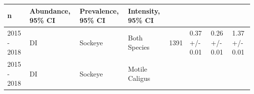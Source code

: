 \documentclass[fleqn,10pt]{wlpeerj} %
\begin{document}
\begin{longtable}[]{@{}llllrlll@{}}
\begin{minipage}[b]{0.04\columnwidth}
n\strut
\end{minipage} & \begin{minipage}[b]{0.14\columnwidth}\raggedright\strut
Abundance, 95\% CI\strut
\end{minipage} & \begin{minipage}[b]{0.14\columnwidth}\raggedright\strut
Prevalence, 95\% CI\strut
\end{minipage} & \begin{minipage}[b]{0.14\columnwidth}\raggedright\strut
Intensity, 95\% CI\strut
\end{minipage}\tabularnewline
\midrule
\endhead
\begin{minipage}[t]{0.09\columnwidth}\raggedright\strut
2015 - 2018\strut
\end{minipage} & \begin{minipage}[t]{0.06\columnwidth}\raggedright\strut
DI\strut
\end{minipage} & \begin{minipage}[t]{0.06\columnwidth}\raggedright\strut
Sockeye\strut
\end{minipage} & \begin{minipage}[t]{0.11\columnwidth}\raggedright\strut
Both Species\strut
\end{minipage} & \begin{minipage}[t]{0.04\columnwidth}\raggedleft\strut
1391\strut
\end{minipage} & \begin{minipage}[t]{0.14\columnwidth}\raggedright\strut
0.37 +/- 0.01\strut
\end{minipage} & \begin{minipage}[t]{0.14\columnwidth}\raggedright\strut
0.26 +/- 0.01\strut
\end{minipage} & \begin{minipage}[t]{0.14\columnwidth}\raggedright\strut
1.37 +/- 0.01\strut
\end{minipage}\tabularnewline
\begin{minipage}[t]{0.09\columnwidth}\raggedright\strut
2015 - 2018\strut
\end{minipage} & \begin{minipage}[t]{0.06\columnwidth}\raggedright\strut
DI\strut
\end{minipage} & \begin{minipage}[t]{0.06\columnwidth}\raggedright\strut
Sockeye\strut
\end{minipage} & \begin{minipage}[t]{0.11\columnwidth}\raggedright\strut
Motile Caligus\strut

\end{minipage}
\end{longtable}
\end{document}

